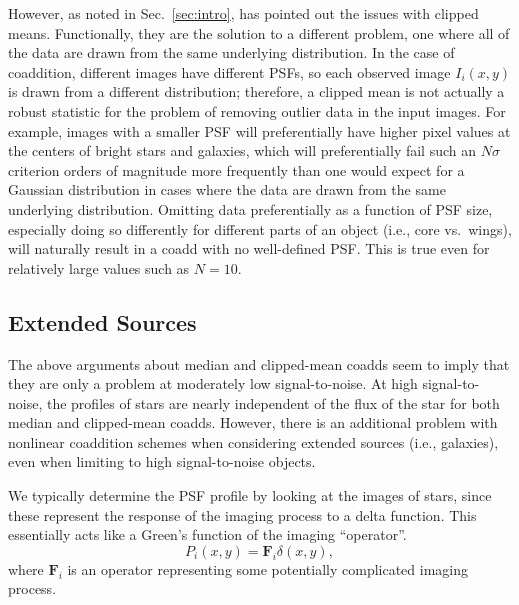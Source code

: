 \documentclass{aastex63}
\newcommand{\irresponse}[1]{{#1}}
\begin{document}
However, as noted in Sec.~\ref{sec:intro}, \citet{2018PASJ...70S...5B} has pointed out the issues with clipped means.  Functionally, they are the solution to a different problem, one where all of the data are drawn from the same underlying distribution.  In the case of coaddition, different images have different PSFs, so \irresponse{each} observed \irresponse{image $I_i(x,y)$} is drawn from a different distribution\irresponse{; therefore, a clipped mean is not actually a robust statistic for the problem of removing outlier data in the input images.}  For example, images with a smaller PSF will preferentially have higher pixel values at the centers of bright stars and galaxies, which will preferentially fail such an $N\sigma$ criterion orders of magnitude more frequently than one would expect for a Gaussian distribution in cases where the data are drawn from the same underlying distribution.  Omitting data preferentially as a function of PSF size, especially doing so differently for different parts of an object (i.e., core vs.\ wings), will naturally result in a coadd with no well-defined PSF. This is true even for relatively large values such as $N=10$.  

\subsection{Extended Sources}\label{subsec:extended}

The above arguments about median and clipped-mean coadds seem to imply that they are only a
problem at moderately low signal-to-noise.  At high signal-to-noise, the profiles of stars are nearly
independent of the flux of the star for both median and clipped-mean coadds.  
However, there is an additional problem with nonlinear coaddition schemes when considering extended sources (i.e., galaxies),
even when limiting to high signal-to-noise objects.

We typically determine the PSF profile by looking at the images of stars, since these represent
the response of the imaging process to a delta function.  This essentially acts like a
Green's function of the imaging ``operator''.
\begin{equation}
    P_i(x,y) = \mathbf{F}_i \delta(x,y),
\end{equation}
where $\mathbf{F}_i$ is an operator representing some potentially complicated imaging process.
\end{document}
